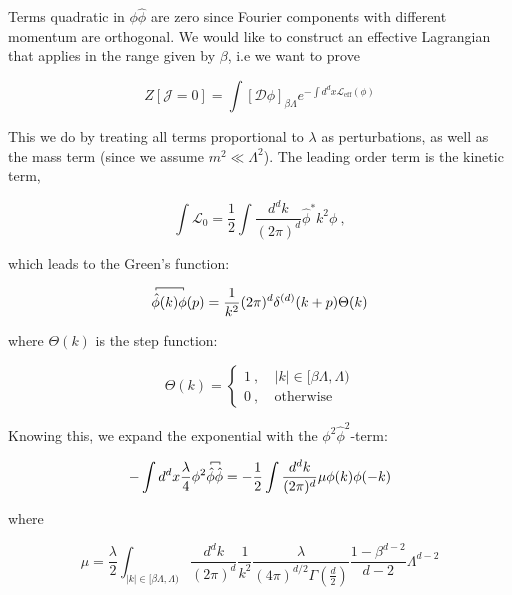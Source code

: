\documentclass[10pt]{report}
\begin{document}
	Terms quadratic in $\phi\hat{\phi}$ are zero since Fourier components with different momentum are orthogonal. We would like to construct an effective Lagrangian that applies in the range given by $\beta$, i.e we want to prove
	
	\begin{equation}
		Z[\mathcal{J}=0] = \int\left[\mathcal{D}\phi\right]_{\beta\Lambda} e^{-\int d^dx\mathcal{L}_{\text{eff}}(\phi)}
	\end{equation}
	
	This we do by treating all terms proportional to $\lambda$ as perturbations, as well as the mass term (since we assume $m^2\ll\Lambda^2$). The leading order term is the kinetic term,
	
	\begin{equation}
		\int\mathcal{L}_0 = \frac{1}{2}\int\frac{d^dk}{(2\pi)^d}\hat{\phi}^*k^2\phi\:,
	\end{equation}
	
	which leads to the Green's function:
	
	\begin{equation}
	\contraction[2pt]{}{\hat{\phi}}{(k)}{\phi}\hat{\phi}(k)\phi(p) = \frac{1}{k^2}(2\pi)^d\delta^{(d)}(k+p)\Theta(k)
	\end{equation}
	
	where $\Theta(k)$ is the step function:
	
	\begin{equation}
		\Theta(k) = \begin{cases}
		1\:,&\:|k|\in[\beta\Lambda,\Lambda)\\
		0\:,&\:\text{otherwise}
		\end{cases}
	\end{equation}
	
	Knowing this, we expand the exponential with the $\phi^2\hat{\phi}^2$-term:
	
	\begin{equation}
		-\int d^dx \frac{\lambda}{4}\phi^2\contraction[2pt]{}{\hat{\phi}}{}{\hat{\phi}}\hat{\phi}\hat{\phi} = -\frac{1}{2}\int \frac{d^dk}{(2\pi)^d}\mu\phi(k)\phi(-k)
		\label{EFT | eq | phi^2hatphi^2-term}
	\end{equation}
	
	where
	
	\begin{equation}
		\mu = \frac{\lambda}{2}\int_{|k|\in[\beta\Lambda,\Lambda)}\frac{d^dk}{(2\pi)^d}\frac{1}{k^2}\frac{\lambda}{(4\pi)^{d/2}\Gamma\left(\frac{d}{2}\right)}\frac{1-\beta^{d-2}}{d-2}\Lambda^{d-2}
	\end{equation}
	
\end{document}
